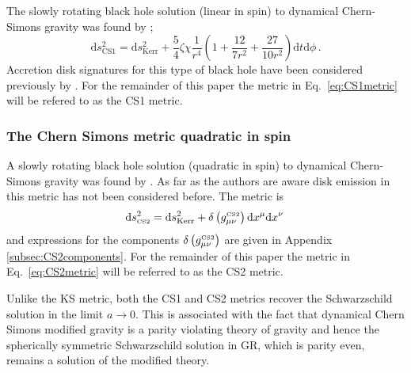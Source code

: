 The slowly rotating black hole solution (linear in spin) to dynamical Chern-Simons gravity was found by \cite{2009PhRvD..79h4043Y};
\begin{equation}\label{eq:CS1metric} \textrm{d}s^{2}_{\textrm{CS}1}=\textrm{d}s^{2}_{\textrm{Kerr}}+\frac{5}{4}\zeta\chi\frac{1}{r^{4}}\left(1+\frac{12}{7r^{2}}+\frac{27}{10r^{2}}\right)\textrm{d}t\textrm{d}\phi \, .\end{equation}
Accretion disk signatures for this type of black hole have been considered previously by \cite{2010CQGra..27j5010H}. For the remainder of this paper the metric in Eq.\ \ref{eq:CS1metric} will be refered to as the CS1 metric.

\subsubsection{The Chern Simons metric quadratic in spin}\label{subsec:CS2}
A slowly rotating black hole solution (quadratic in spin) to dynamical Chern-Simons gravity was found by \cite{2012PhRvD..86d4037Y}. As far as the authors are aware disk emission in this metric has not been considered before. The metric is
\begin{equation}\label{eq:CS2metric} \textrm{d}s^{2}_{\mbox{\tiny CS2}} = \textrm{d}s^{2}_{\textrm{Kerr}}+\delta\left(g_{\mu\nu}^{\mbox{\tiny CS2}} \right)\textrm{d}x^{\mu}\textrm{d}x^{\nu}\, \end{equation}
and expressions for the components $\delta\left(g_{\mu\nu}^{\mbox{\tiny CS2}} \right)$ are given in Appendix \ref{subsec:CS2components}. For the remainder of this paper the metric in Eq.\ \ref{eq:CS2metric} will be referred to as the CS2 metric.

Unlike the KS metric, both the CS1 and CS2 metrics recover the Schwarzschild solution in the limit $a\rightarrow 0$. This is associated with the fact that dynamical Chern Simons modified gravity is a parity violating theory of gravity and hence the spherically symmetric Schwarzschild solution in GR, which is parity even, remains a solution of the modified theory.

